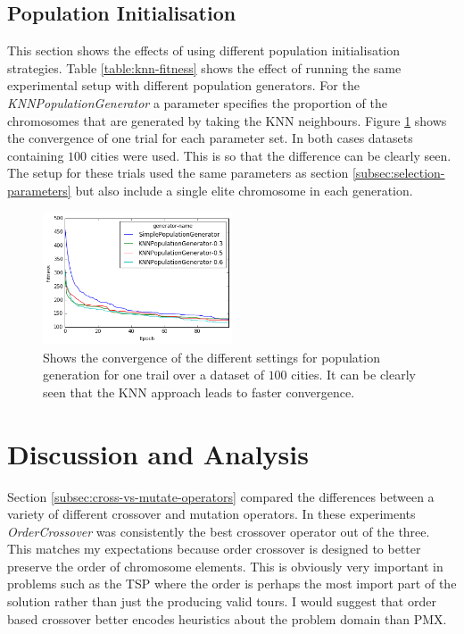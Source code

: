 \documentclass[journal]{IEEEtran}
\begin{document}
\subsection{Population Initialisation}
This section shows the effects of using different population initialisation strategies. Table \ref{table:knn-fitness} shows the effect of running the same experimental setup with different population generators. For the \textit{KNNPopulationGenerator} a parameter specifies the proportion of the chromosomes that are generated by taking the KNN neighbours. Figure \ref{fig:knn-convergence} shows the convergence of one trial for each parameter set. In both cases datasets containing $100$ cities were used. This is so that the difference can be clearly seen. The setup for these trials used the same parameters as section \ref{subsec:selection-parameters} but also include a single elite chromosome in each generation.


\begin{figure}[H]
\centering
\includegraphics[width=0.5\textwidth]{figures/knn_convergence.png}
\caption{Shows the convergence of the different settings for population generation for one trail over a dataset of $100$ cities. It can be clearly seen that the KNN approach leads to faster convergence.}
\label{fig:knn-convergence}
\end{figure}


\section{Discussion and Analysis}
Section \ref{subsec:cross-vs-mutate-operators} compared the differences between a variety of different crossover and mutation operators. In these experiments \textit{OrderCrossover} was consistently the best crossover operator out of the three. This matches my expectations because order crossover is designed to better preserve the order of chromosome elements. This is obviously very important in problems such as the TSP where the order is perhaps the most import part of the solution rather than just the producing valid tours. I would suggest that order based crossover better encodes heuristics about the problem domain than PMX.
\end{document}
